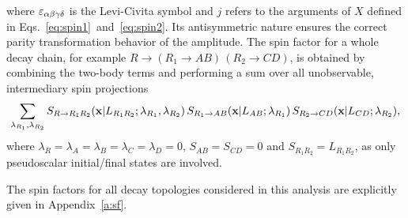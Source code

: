 where $\eps_{\alpha\beta\gamma\delta}$ is the Levi-Civita symbol and $j$ refers to the arguments of $X$ defined in Eqs.~\ref{eq:spin1}~and~\ref{eq:spin2}.
Its antisymmetric nature ensures the correct parity 
transformation behavior of the amplitude. 
The spin factor for a whole decay chain, for example $R \to (R_{1} \to AB) \, (R_{2} \to CD)$,
 is obtained by combining the two-body terms and performing a sum over all unobservable, intermediary spin projections
\begin{equation}
	\sum_{\lambda_{R_{1}},\lambda_{R_{2}}}   S_{R \to R_{1} R_{2}}(\bold x \vert L_{R_{1}R_{2}} ; \lambda_{R_{1}} , \lambda_{R_{2}}) \, 
	S_{R_{1} \to AB}(\bold x \vert L_{AB} ; \lambda_{R_{1}}) 
	\, S_{R_{2} \to CD}(\bold x \vert L_{CD} ; \lambda_{R_{2}}) ,
\end{equation}
where $\lambda_{R} = \lambda_{A} = \lambda_{B}  = \lambda_{C}  = \lambda_{D} = 0$,  $S_{AB} = S_{CD} = 0$ and $S_{R_{1}R_{2}} =  L_{R_{1}R_{2}}$, as only pseudoscalar initial/final states are involved.

The spin factors for all decay topologies considered in this analysis are explicitly given in Appendix~\ref{a:sf}.

